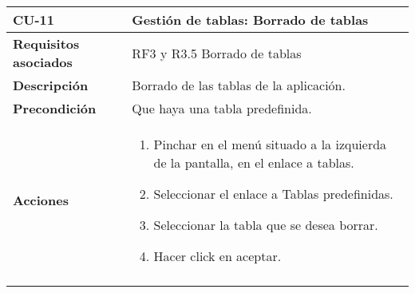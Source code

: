 \newpage
\begin{longtable}[H]{@{}ll@{}}
\toprule
\begin{minipage}[b]{0.23\columnwidth}\raggedright\strut
\textbf{CU-11}\strut
\end{minipage} & \begin{minipage}[b]{0.71\columnwidth}\raggedright\strut
\textbf{Gestión de tablas: Borrado de tablas}\strut
\end{minipage}\tabularnewline
\midrule
\endhead
\begin{minipage}[t]{0.23\columnwidth}\raggedright\strut
\textbf{Requisitos asociados}\strut
\end{minipage} & \begin{minipage}[t]{0.71\columnwidth}\raggedright\strut
RF3 y R3.5 Borrado de tablas\strut
\end{minipage}\tabularnewline
\begin{minipage}[t]{0.23\columnwidth}\raggedright\strut
\textbf{Descripción}\strut
\end{minipage} & \begin{minipage}[t]{0.71\columnwidth}\raggedright\strut
Borrado de las tablas de la aplicación.
\strut
\end{minipage}\tabularnewline
\begin{minipage}[t]{0.23\columnwidth}\raggedright\strut
\textbf{Precondición}\strut
\end{minipage} & \begin{minipage}[t]{0.71\columnwidth}\raggedright\strut
Que haya una tabla predefinida.\strut
\end{minipage}\tabularnewline
\begin{minipage}[t]{0.23\columnwidth}\raggedright\strut
\textbf{Acciones}\strut
\end{minipage} & \begin{minipage}[t]{0.71\columnwidth}\raggedright\strut
\begin{enumerate}
\def\labelenumi{\arabic{enumi}.}
\tightlist
\item
Pinchar en el menú situado a la izquierda de la pantalla, en el
enlace a tablas.
\item
Seleccionar el enlace a Tablas predefinidas.
\item
Seleccionar la tabla que se desea borrar.
\item
Hacer click en aceptar.
\end{enumerate}\strut
\end{minipage}\tabularnewline
\begin{minipage}[t]{0.23\columnwidth}\raggedright\strut

\end{minipage}
\end{longtable}
